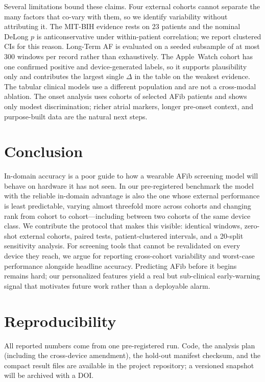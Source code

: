 Several limitations bound these claims. Four external cohorts cannot separate the
many factors that co-vary with them, so we identify variability without
attributing it. The MIT-BIH evidence rests on 23 patients and the nominal DeLong
$p$ is anticonservative under within-patient correlation; we report clustered CIs
for this reason. Long-Term AF is evaluated on a seeded subsample of at most 300
windows per record rather than exhaustively. The Apple~Watch cohort has one
confirmed positive and device-generated labels, so it supports plausibility only
and contributes the largest single $\Delta$ in the table on the weakest evidence.
The tabular clinical models use a different population and are not a cross-modal
ablation. The onset analysis uses cohorts of selected AFib patients and shows only
modest discrimination; richer atrial markers, longer pre-onset context, and
purpose-built data are the natural next steps.

\section{Conclusion}
In-domain accuracy is a poor guide to how a wearable AFib screening model will
behave on hardware it has not seen. In our pre-registered benchmark the model with
the reliable in-domain advantage is also the one whose external performance is
least predictable, varying almost threefold more across cohorts and changing rank
from cohort to cohort---including between two cohorts of the same device class. We
contribute the protocol that makes this visible: identical windows, zero-shot
external cohorts, paired tests, patient-clustered intervals, and a 20-split
sensitivity analysis. For screening tools that cannot be revalidated on every
device they reach, we argue for reporting cross-cohort variability and worst-case
performance alongside headline accuracy. Predicting AFib before it begins remains
hard; our personalized features yield a real but sub-clinical early-warning signal
that motivates future work rather than a deployable alarm.

\section*{Reproducibility}
All reported numbers come from one pre-registered run. Code, the analysis plan
(including the cross-device amendment), the hold-out manifest checksum, and the
compact result files are available in the project repository; a versioned snapshot
will be archived with a DOI.





